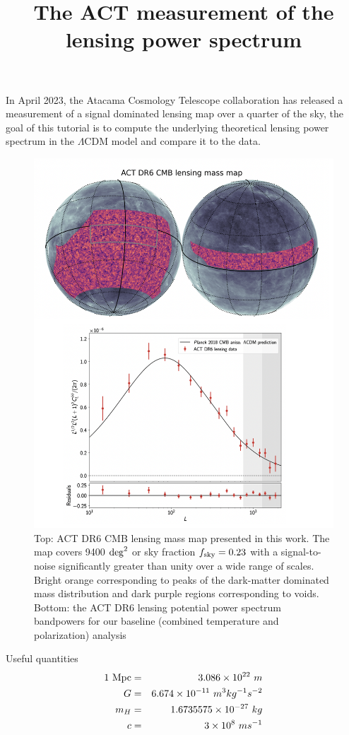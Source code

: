 \documentclass[a4paper, 11pt]{article}
\title{The ACT measurement of the lensing power spectrum}
\def\ba{\begin{eqnarray}}
\def\ea{\end{eqnarray}}
\begin{document}
\maketitle

In April 2023, the Atacama Cosmology Telescope collaboration has released a measurement of a signal dominated lensing map over a quarter of the sky, the goal of this tutorial is to compute 
the underlying theoretical lensing power spectrum in the $\Lambda$CDM model and compare it to the data.

\begin{figure}[h!]
  \centering
  \includegraphics[width=0.7\columnwidth]{lensing_dr6.png}
  \caption{Top: ACT DR6 CMB lensing mass map presented in this work. The map covers 9400 ${\rm deg}^{2}$
or sky fraction $f_{\rm sky} = 0.23$ with a signal-to-noise significantly greater than unity over a wide range of scales. Bright orange corresponding to peaks of the dark-matter dominated mass distribution and
dark purple regions corresponding to voids. Bottom: the ACT DR6 lensing potential power spectrum bandpowers for our baseline (combined temperature and polarization) analysis}
  \label{fig:dr6_lensing}
\end{figure}



Useful quantities
\ba
1 \ \rm{Mpc} &=& 3.086 \times 10^{22} \ m \nonumber \\
G &=& 6.674 \times 10^{-11}  \  m^{3} kg^{-1} s^{-2} \nonumber \\
m_{H} &=& 1.6735575  \times10^{-27}  \ kg\nonumber \\
c &=& 3 \times 10^{8} \ m s^{-1} \nonumber \\
\ea
\end{document}
